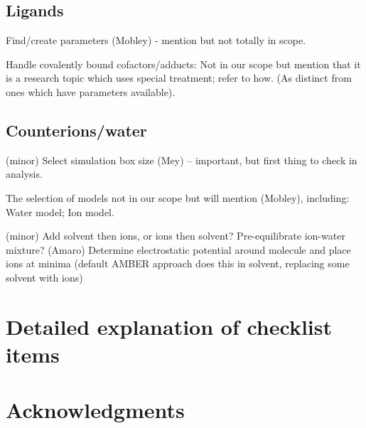 \documentclass[9pt]{livecoms}
\begin{document}
\subsection{Ligands}

Find/create parameters (Mobley) - mention but not totally in scope.

Handle covalently bound cofactors/adducts: Not in our scope but mention that it is a research topic which uses special treatment; refer to how. (As distinct from ones which have parameters available). 

\subsection{Counterions/water}
(minor) Select simulation box size (Mey) -- important, but first thing to check in analysis.

The selection of models not in our scope but will mention (Mobley), including: Water model; Ion model.

(minor) Add solvent then ions, or ions then solvent? Pre-equilibrate ion-water mixture? (Amaro)
Determine electrostatic potential around molecule and place ions at minima (default AMBER approach does this in solvent, replacing some solvent with ions)



\section{Detailed explanation of checklist items}


\section{Acknowledgments}




\end{document}
